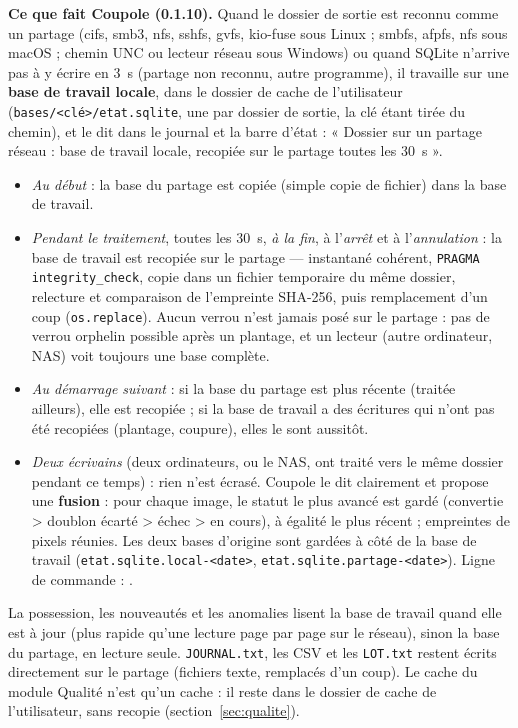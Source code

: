 \textbf{Ce que fait Coupole (0.1.10).} Quand le dossier de sortie est reconnu comme un partage (cifs, smb3, nfs,
sshfs, gvfs, kio-fuse sous Linux ; smbfs, afpfs, nfs sous macOS ; chemin UNC ou lecteur réseau sous Windows) ou
quand SQLite n'arrive pas à y écrire en 3~s (partage non reconnu, autre programme), il travaille sur une
\textbf{base de travail locale}, dans le dossier de cache de l'utilisateur (\texttt{bases/<clé>/etat.sqlite},
une par dossier de sortie, la clé étant tirée du chemin), et le dit dans le journal et la barre d'état :
« Dossier sur un partage réseau : base de travail locale, recopiée sur le partage toutes les 30~s ».
\begin{itemize}[nosep]
\item \emph{Au début} : la base du partage est copiée (simple copie de fichier) dans la base de travail.
\item \emph{Pendant le traitement}, toutes les 30~s, \emph{à la fin}, à l'\emph{arrêt} et à l'\emph{annulation} :
  la base de travail est recopiée sur le partage --- instantané cohérent, \texttt{PRAGMA integrity\_check},
  copie dans un fichier temporaire du même dossier, relecture et comparaison de l'empreinte SHA-256, puis
  remplacement d'un coup (\texttt{os.replace}). Aucun verrou n'est jamais posé sur le partage : pas de verrou
  orphelin possible après un plantage, et un lecteur (autre ordinateur, NAS) voit toujours une base complète.
\item \emph{Au démarrage suivant} : si la base du partage est plus récente (traitée ailleurs), elle est recopiée ; si
  la base de travail a des écritures qui n'ont pas été recopiées (plantage, coupure), elles le sont aussitôt.
\item \emph{Deux écrivains} (deux ordinateurs, ou le NAS, ont traité vers le même dossier pendant ce temps) : rien
  n'est écrasé. Coupole le dit clairement et propose une \textbf{fusion} : pour chaque image, le statut le plus
  avancé est gardé (convertie > doublon écarté > échec > en cours), à égalité le plus récent ; empreintes de
  pixels réunies. Les deux bases d'origine sont gardées à côté de la base de travail
  (\texttt{etat.sqlite.local-<date>}, \texttt{etat.sqlite.partage-<date>}). Ligne de commande :
  .
\end{itemize}
La possession, les nouveautés et les anomalies lisent la base de travail quand elle est à jour (plus rapide qu'une
lecture page par page sur le réseau), sinon la base du partage, en lecture seule. \texttt{JOURNAL.txt}, les CSV et
les \texttt{LOT.txt} restent écrits directement sur le partage (fichiers texte, remplacés d'un coup). Le cache du
module Qualité n'est qu'un cache : il reste dans le dossier de cache de l'utilisateur, sans recopie
(section~\ref{sec:qualite}).


